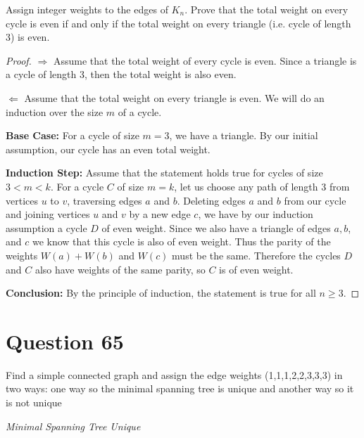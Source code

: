 \documentclass[11pt, oneside]{article}   	%
\begin{document}
Assign integer weights to the edges of $K_n$. Prove that the total weight on every cycle is even if and only if the total weight on every triangle (i.e. cycle of length 3) is even.
\begin{proof}
$\Rightarrow$ Assume that the total weight of every cycle is even. Since a triangle is a cycle of length 3, then the total weight is also even.

$\Leftarrow$ Assume that the total weight on every triangle is even. We will do an induction over the size $m$ of a cycle.

\textbf{Base Case:} For a cycle of size $m =3$, we have a triangle. By our initial assumption, our cycle has an even total weight.

\textbf{Induction Step:} Assume that the statement holds true for cycles of size $3 < m < k$. For a cycle $C$ of size $m=k$, let us choose any path of length 3 from vertices $u$ to $v$, traversing edges $a$ and $b$. Deleting edges $a$ and $b$ from our cycle and joining vertices $u$ and $v$ by a new edge $c$, we have by our induction assumption a cycle $D$ of even weight. Since we also have a triangle of edges $a, b$, and $c$ we know that this cycle is also of even weight. Thus the parity of the weights $W(a) + W(b)$ and $W(c)$ must be the same. Therefore the cycles $D$ and $C$ also have weights of the same parity, so $C$ is of even weight.

\textbf{Conclusion:} By the principle of induction,  the statement is true for all $n \geq 3$.

\end{proof}

\cleardoublepage
\section*{Question 65}

Find a simple connected graph and assign the edge weights (1,1,1,2,2,3,3,3) in two ways: one way so the minimal spanning tree is unique and another way so it is not unique

\emph{Minimal Spanning Tree Unique}
\end{document}
